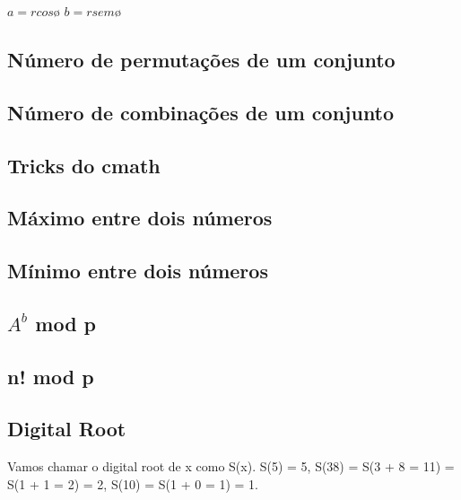 \documentclass[a4paper,12pt]{article}
\begin{document}
\( a = r cos ø\) \newline
\( b = r sem ø\)

\subsection{Número de permutações de um conjunto}


\subsection{Número de combinações de um conjunto}


\subsection{Tricks do cmath}


\subsection{Máximo entre dois números}


\subsection{Mínimo entre dois números}


\subsection{$A^b$ mod p}


\subsection{n! mod p}


\subsection{Digital Root}
Vamos chamar o digital root de x como S(x). S(5) = 5, S(38) = S(3 + 8 = 11) = S(1 + 1 = 2) = 2, S(10) = S(1 + 0 = 1) = 1.
\end{document}
